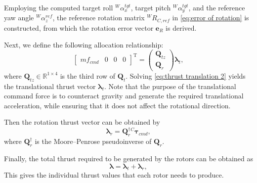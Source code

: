 Employing the computed target roll $^W\!\alpha^{tgt}_x$, target pitch $^W\!\alpha^{tgt}_y$, and the reference yaw angle $^W\!\alpha^{ref}_z$, the reference rotation matrix $^W\!R_{C,ref}$ in \eqref{eq:error of rotation} is constructed, from which the rotation error vector ${\boldsymbol{e}_R}$ is derived. 

Next, we define the following allocation relationship:
\begin{equation}
\label{eq:thrust translation 2}
     \begin{bmatrix} mf_{cmd}&0&0&0\end{bmatrix}^{\mathrm{T}}=\begin{pmatrix}
\boldsymbol{Q}_{tz} \\
\boldsymbol{Q}_r
\end{pmatrix}\boldsymbol{\lambda}_t,
\end{equation}
where $\boldsymbol{Q}_{tz} \in \mathbb{R}^{1 \times 4}$ is the third row of $\boldsymbol{Q}_t$. Solving \eqref{eq:thrust translation 2} yields the translational thrust vector $\boldsymbol{\lambda}_t$. Note that the purpose of the translational command force is to counteract gravity and generate the required translational acceleration, while ensuring that it does not affect the rotational direction.

Then the rotation thrust vector can be obtained by
\begin{equation}
\label{eq:thrust rotation 1}
     \boldsymbol{\lambda}_r=\boldsymbol{Q}_r^{\dagger}{^{C}\boldsymbol{\tau}_{cmd}},
\end{equation}
where $\boldsymbol{Q}_r^{\dagger}$ is the Moore–Penrose pseudoinverse of $ \boldsymbol{Q}_r$.

Finally, the total thrust required to be generated by the rotors can be obtained as
\begin{equation}
\label{eq:thrust}
\boldsymbol{\lambda}=\boldsymbol{\lambda}_t+\boldsymbol{\lambda}_r,
\end{equation}
This gives the individual thrust values that each rotor needs to produce. 

